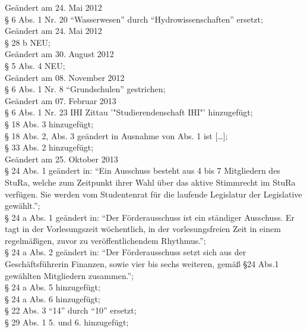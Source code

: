 Geändert am 24. Mai 2012\\
§ 6 Abs. 1 Nr. 20 "`Wasserwesen"' durch "`Hydrowissenschaften"' ersetzt; \\

Geändert am 24. Mai 2012\\
§ 28 b NEU; \\

Geändert am 30. August 2012\\
§ 5 Abs. 4 NEU; \\

Geändert am 08. November 2012\\
§ 6 Abs. 1 Nr. 8 "`Grundschulen"' gestrichen; \\

Geändert am 07. Februar 2013\\
§ 6 Abs. 1 Nr. 23 IHI Zittau '"Studierendenschaft IHI"' hinzugefügt; \\
§ 18 Abs. 3 hinzugefügt; \\
§ 18 Abs. 2, Abs. 3 geändert in Ausnahme von Abs. 1 ist [\ldots]; \\
§ 33 Abs. 2 hinzugefügt; \\

Geändert am 25. Oktober 2013 \\
§ 24 Abs. 1 geändert in: "`Ein Ausschuss besteht aus 4 bis 7 Mitgliedern des StuRa, welche zum Zeitpunkt ihrer Wahl über das aktive Stimmrecht im StuRa verfügen. Sie werden vom Studentenrat für die laufende Legislatur der Legislative gewählt."'; \\
§ 24 a Abs. 1 geändert in: "`Der Förderausschuss ist ein ständiger Ausschuss. Er tagt in der Vorlesungszeit wöchentlich, in der vorlesungsfreien Zeit in einem regelmäßigen, zuvor zu veröffentlichendem Rhythmus."'; \\
§ 24 a Abs. 2 geändert in: "`Der Förderausschuss setzt sich aus der Geschäftsführerin Finanzen, sowie vier bis sechs weiteren, gemäß §24 Abs.1 gewählten Mitgliedern zusammen."'; \\
§ 24 a Abs. 5 hinzugefügt; \\
§ 24 a Abs. 6 hinzugefügt; \\
§ 22 Abs. 3 "`14"' durch "`10"' ersetzt; \\
§ 29 Abs. 1 5. und 6. hinzugefügt; \\

\normalsize

